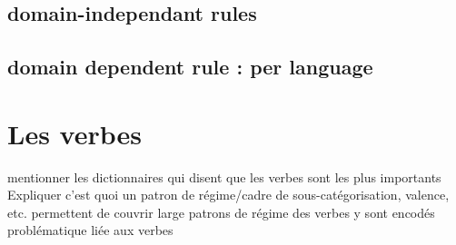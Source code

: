 \subsection{domain-independant rules}
\subsection{domain dependent rule : per language}

\section{Les verbes}
mentionner les dictionnaires qui disent que les verbes sont les plus importants
Expliquer c'est quoi un patron de régime/cadre de sous-catégorisation, valence, etc.
permettent de couvrir large
patrons de régime des verbes y sont encodés
problématique liée aux verbes
